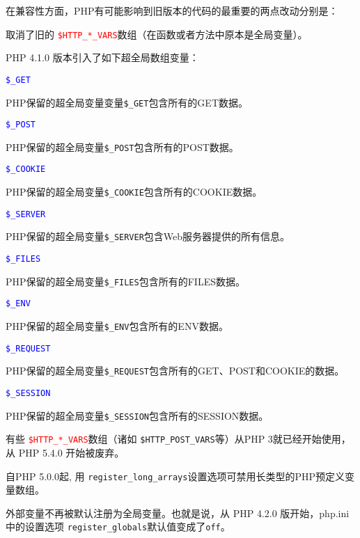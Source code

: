 在兼容性方面，PHP有可能影响到旧版本的代码的最重要的两点改动分别是：

\begin{compactitem}
\item 取消了旧的 \textcolor{red}{\texttt{\$HTTP\_*\_VARS}}数组（在函数或者方法中原本是全局变量）。

\end{compactitem}

PHP 4.1.0 版本引入了如下超全局数组变量：

\begin{compactitem}
\item \textcolor{blue}{\texttt{\$\_GET}}

PHP保留的超全局变量变量\texttt{\$\_GET}包含所有的GET数据。
\item \textcolor{blue}{\texttt{\$\_POST}}

PHP保留的超全局变量\texttt{\$\_POST}包含所有的POST数据。
\item \textcolor{blue}{\texttt{\$\_COOKIE}}

PHP保留的超全局变量\texttt{\$\_COOKIE}包含所有的COOKIE数据。
\item \textcolor{blue}{\texttt{\$\_SERVER}}

PHP保留的超全局变量\texttt{\$\_SERVER}包含Web服务器提供的所有信息。

\item \textcolor{blue}{\texttt{\$\_FILES}}

PHP保留的超全局变量\texttt{\$\_FILES}包含所有的FILES数据。
\item \textcolor{blue}{\texttt{\$\_ENV}}

PHP保留的超全局变量\texttt{\$\_ENV}包含所有的ENV数据。
\item \textcolor{blue}{\texttt{\$\_REQUEST}}

PHP保留的超全局变量\texttt{\$\_REQUEST}包含所有的GET、POST和COOKIE的数据。
\item \textcolor{blue}{\texttt{\$\_SESSION}}

PHP保留的超全局变量\texttt{\$\_SESSION}包含所有的SESSION数据。
\end{compactitem}

有些 \textcolor{red}{\texttt{\$HTTP\_*\_VARS}}数组（诸如 \texttt{\$HTTP\_POST\_VARS}等）从PHP 3就已经开始使用，从 PHP 5.4.0 开始被废弃。


自PHP 5.0.0起, 用 \texttt{register\_long\_arrays}设置选项可禁用长类型的PHP预定义变量数组。


\begin{compactitem}
\item 外部变量不再被默认注册为全局变量。也就是说，从 PHP 4.2.0 版开始，php.ini 中的设置选项 \texttt{register\_globals}默认值变成了\texttt{off}。

\end{compactitem}

